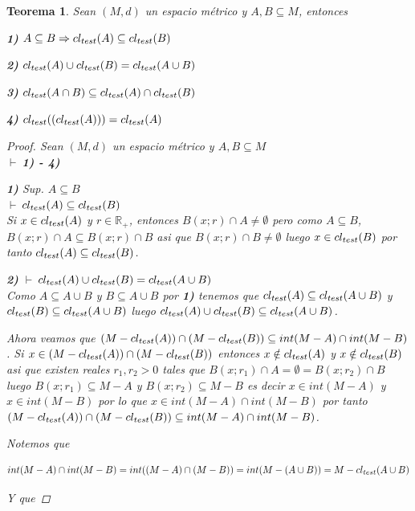 \documentclass[oneside]{book} %
\theoremstyle{Teorema}
\newtheorem{Teorema}[Definicion]{Teorema}
\theoremstyle{Ejemplos}
\theoremstyle{[Obs]}
\def \test {test}
\newcommand{\cerradura}[2][\test]{\ifx \test #1 {\overline{#2}} \else {cl_{#1}(#2)} \fi} %
\renewcommand{\{}{\left\lbrace} %
\renewcommand{\}}{\right\rbrace} %
\renewcommand{\u}{\cup} %
\newcommand{\n}{\cap} %
\renewcommand{\sc}{\subseteq} %
\newcommand{\R}{\mathbb{R}} %
\newcommand{\pd}{$\vdash\ $} %
\begin{document}
			\begin{Teorema}\setlength{\parindent}{0em}
			
				Sean $(M, d)$ un espacio métrico y $A, B \sc M$, entonces 

				\textbf{1)} $A \sc B \Rightarrow \cerradura{A} \sc \cerradura{B}$

				\textbf{2)} $\cerradura{A} \u \cerradura{B} = \cerradura{A \u B}$

				\textbf{3)} $\cerradura{A \n B} \sc \cerradura{A} \n \cerradura{B}$

				\textbf{4)} $\cerradura{ (\cerradura{A}) } = \cerradura{A}$
			
				\begin{proof}
					
					Sean $(M, d)$ un espacio métrico y $A, B \sc M$ \\ 
					\pd \textbf{1) - 4)} 

					\textbf{1)} Sup. $A \sc B$ \\ 
					\pd $\cerradura{A} \sc \cerradura{B}$ \\ 
					Si $x \in \cerradura{A}$ y $r \in \R_{+}$, entonces $B(x;r) \n A \neq \emptyset$ pero como $A \sc B$, $B(x;r) \n A \sc B(x;r) \n B$ asi que $B(x;r) \n B \neq \emptyset$ luego $x \in \cerradura{B}$ por tanto $\cerradura{A} \sc \cerradura{B}$. 

					\textbf{2)} \pd $\cerradura{A} \u \cerradura{B} = \cerradura{A \u B}$ \\ 
					Como $A \sc A \u B$ y $B \sc A \u B$ por \textbf{1)} tenemos que $\cerradura{A} \sc \cerradura{A \u B}$ y $\cerradura{B} \sc \cerradura{A \u B}$ luego $\cerradura{A} \u \cerradura{B} \sc \cerradura{A \u B}$.

					Ahora veamos que $(M - \cerradura{A}) \n (M - \cerradura{B}) \sc int(M - A) \n int(M - B)$. Si $x \in (M - \cerradura{A}) \n (M - \cerradura{B})$ entonces $x \notin \cerradura{A}$ y $x \notin \cerradura{B}$ asi que existen reales $r_1, r_2 > 0$ tales que $B(x;r_1) \n A = \emptyset = B(x;r_2) \n B$ luego $B(x;r_1) \sc M - A$ y $B(x;r_2) \sc M - B$ es decir $x \in int(M - A)$ y $x \in int(M - B)$ por lo que $x \in int(M - A) \n int(M - B)$ por tanto $(M - \cerradura{A}) \n (M - \cerradura{B}) \sc int(M - A) \n int(M - B)$.

					Notemos que 

					\[ int(M - A) \n int(M - B) = int((M - A) \n (M - B)) = int(M - (A \u B)) = M - \cerradura{A \u B} \] 

					Y que 


\end{proof}
\end{Teorema}
\end{document}
